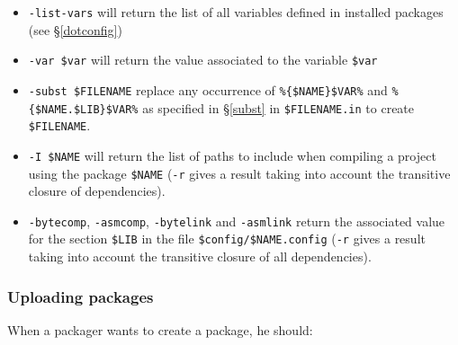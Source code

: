 \documentclass[a4paper,11pt]{article}
\begin{document}
\begin{itemize}
\item \verb+-list-vars+ will return the list of all variables defined
  in installed packages (see \S\ref{dotconfig})
\item \verb+-var $var+ will return the value associated to the
  variable \verb+$var+
\item \verb+-subst $FILENAME+ replace any occurrence of
  \verb+%{$NAME}$VAR%+ and \verb+%{$NAME.$LIB}$VAR%+ as specified in
  \S\ref{subst} in \verb+$FILENAME.in+ to create \verb+$FILENAME+.
\item \verb+-I $NAME+ will return the list of paths to include when
  compiling a project using the package \verb+$NAME+ (\verb+-r+ gives
  a result taking into account the transitive closure of
  dependencies).
\item \verb+-bytecomp+, \verb+-asmcomp+, \verb+-bytelink+ and
  \verb+-asmlink+ return the associated value for the section
  \verb+$LIB+ in the file \verb+$config/$NAME.config+ (\verb+-r+ gives
  a result taking into account the transitive closure of all
  dependencies).
\end{itemize}


\subsubsection{Uploading packages}
\label{opam-upload}

When a packager wants to create a package, he should:
\end{document}
